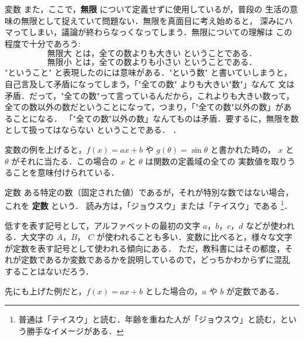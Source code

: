 \begin{mysmallsec}{変数}
{                    また，ここで，\textbf{無限} について定義せずに使用しているが，普段の
                    生活の意味の無限として捉えていて問題ない．無限を真面目に考え始めると，
                    深みにハマってしまい，議論が終わらなっくなってしまう．無限についての理解は
                    この程度で十分であろう:
                        \begin{equation*}
                            \mbox{無限大 とは，全ての数よりも大きい ということである．}
                        \end{equation*}
                        \begin{equation*}
                            \mbox{無限小 とは，全ての数よりも小さい ということである．}
                        \end{equation*}
                    "ということ" と表現したのには意味がある．"という数" と書いていしまうと，
                    自己言及して矛盾になってしまう，「"全ての数" よりも大きい"数"」なんて
                    文は矛盾．だって，"全ての数"って言っているんだから，これよりも大きい数って，
                    全ての数以外の数だということになって，つまり，「"全ての数"以外の数」があることになる．
                    「"全ての数"以外の数」なんてものは矛盾．要するに，無限を数として扱ってはならない
                    ということである．
                }．

            変数の例を上げると，$f(x)=ax+b$ や $g(\theta)=\sin\theta$ と書かれた時の，
            $x$ と $\theta$ がそれに当たる．この場合の $x$ と $\theta$ は関数の定義域の全ての
            実数値を取りうることを意味付けられている．
        \end{mysmallsec}

        \begin{mysmallsec}{定数}
            ある特定の数（固定された値）であるが，それが特別な数ではない場合，これを \textbf{定数} という．
            読み方は，「ジョウスウ」または「テイスウ」である
                \footnote{
                    普通は「テイスウ」と読む．年齢を重ねた人が「ジョウスウ」と読む，という勝手なイメージがある．
                }．

            低すを表す記号として，アルファベットの最初の文字 $a$，$b$，$c$，$d$ などが使われる．大文字の $A$，$B$，
            $C$ が使われることも多い．変数に比べると，様々な文字が定数を表す記号として使われる傾向にある．
            ただ，教科書にはその都度，それが定数であるか変数であるかを説明しているので，どっちかわからずに混乱
            することはないだろう．

            先にも上げた例だと，$f(x)=ax+b$ とした場合の，$a$ や $b$ が定数である．
        \end{mysmallsec}


